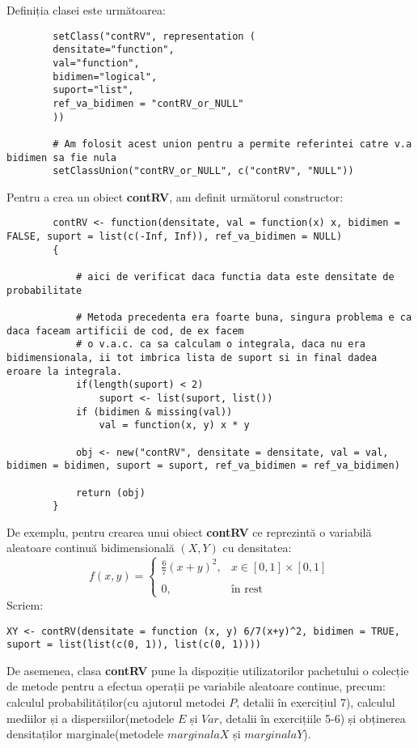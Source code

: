 \documentclass[12pt]{article}
\begin{document}
	Definiția clasei este următoarea:
	\begin{lstlisting}
		setClass("contRV", representation (
		densitate="function",
		val="function",
		bidimen="logical",
		suport="list",
		ref_va_bidimen = "contRV_or_NULL"
		))
		
		# Am folosit acest union pentru a permite referintei catre v.a bidimen sa fie nula
		setClassUnion("contRV_or_NULL", c("contRV", "NULL"))
	\end{lstlisting}\pagebreak
	
	Pentru a crea un obiect \textbf{contRV}, am definit următorul constructor:
	\begin{lstlisting}
		contRV <- function(densitate, val = function(x) x, bidimen = FALSE, suport = list(c(-Inf, Inf)), ref_va_bidimen = NULL)
		{
			
			# aici de verificat daca functia data este densitate de probabilitate
			
			# Metoda precedenta era foarte buna, singura problema e ca daca faceam artificii de cod, de ex facem
			# o v.a.c. ca sa calculam o integrala, daca nu era bidimensionala, ii tot imbrica lista de suport si in final dadea eroare la integrala.
			if(length(suport) < 2)
				suport <- list(suport, list())
			if (bidimen & missing(val))
				val = function(x, y) x * y
			
			obj <- new("contRV", densitate = densitate, val = val, bidimen = bidimen, suport = suport, ref_va_bidimen = ref_va_bidimen)
			
			return (obj)
		}
	\end{lstlisting}

	De exemplu, pentru crearea unui obiect \textbf{contRV} ce reprezintă o variabilă aleatoare continuă bidimensională $(X, Y)$ cu densitatea:
	\[ 
	f(x, y)= \left\{
	\begin{array}{ll}
		\frac{6}{7}(x+y)^2, & x \in [0, 1] \times [0, 1] \\\\
		0,				   & \text{în rest}
	\end{array} 
	\right. 
	\]
	Scriem:
	\begin{lstlisting}[numbers=none]
		XY <- contRV(densitate = function (x, y) 6/7(x+y)^2, bidimen = TRUE, suport = list(list(c(0, 1)), list(c(0, 1))))
	\end{lstlisting}\vspace*{1\baselineskip}
	
	
	De asemenea, clasa \textbf{contRV} pune la dispoziție utilizatorilor pachetului o colecție de metode pentru a efectua operații pe variabile aleatoare continue, precum: calculul probabilităților(cu ajutorul metodei $P$, detalii în exercițiul 7), calculul mediilor și a dispersiilor(metodele $E$ și $Var$, detalii în exercițiile 5-6) și obținerea densitaților marginale(metodele $marginalaX$ și $marginalaY$).
\end{document}
